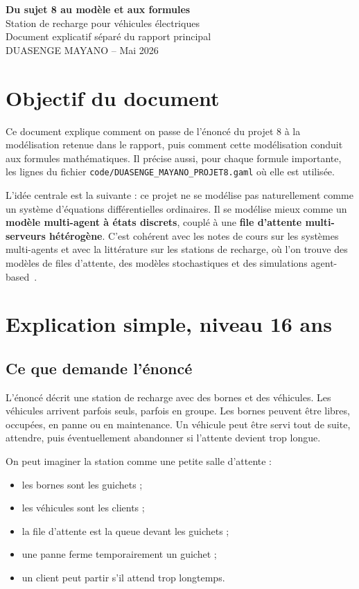 \documentclass[11pt]{article}
\begin{document}
\begin{center}
{\Large\bfseries Du sujet 8 au modèle et aux formules}\\[4pt]
{\large Station de recharge pour véhicules électriques}\\[8pt]
{\normalsize Document explicatif séparé du rapport principal}\\[8pt]
{\normalsize DUASENGE MAYANO -- Mai 2026}
\end{center}

\section*{Objectif du document}

Ce document explique comment on passe de l'énoncé du projet 8 à la modélisation retenue dans le rapport, puis comment cette modélisation conduit aux formules mathématiques. Il précise aussi, pour chaque formule importante, les lignes du fichier \texttt{code/DUASENGE\_MAYANO\_PROJET8.gaml} où elle est utilisée.

L'idée centrale est la suivante : ce projet ne se modélise pas naturellement comme un système d'équations différentielles ordinaires. Il se modélise mieux comme un \textbf{modèle multi-agent à états discrets}, couplé à une \textbf{file d'attente multi-serveurs hétérogène}. C'est cohérent avec les notes de cours sur les systèmes multi-agents et avec la littérature sur les stations de recharge, où l'on trouve des modèles de files d'attente, des modèles stochastiques et des simulations agent-based~\cite{farkas2018,kim2017,garcia2018,karlsson2023}.

\section{Explication simple, niveau 16 ans}

\subsection{Ce que demande l'énoncé}

L'énoncé décrit une station de recharge avec des bornes et des véhicules. Les véhicules arrivent parfois seuls, parfois en groupe. Les bornes peuvent être libres, occupées, en panne ou en maintenance. Un véhicule peut être servi tout de suite, attendre, puis éventuellement abandonner si l'attente devient trop longue.

On peut imaginer la station comme une petite salle d'attente :
\begin{itemize}
  \item les bornes sont les guichets ;
  \item les véhicules sont les clients ;
  \item la file d'attente est la queue devant les guichets ;
  \item une panne ferme temporairement un guichet ;
  \item un client peut partir s'il attend trop longtemps.
\end{itemize}
\end{document}
